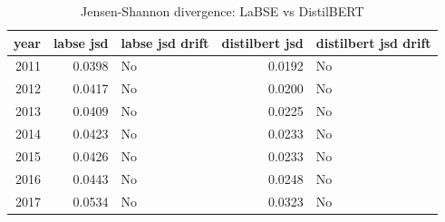 \begin{table}[ht]
\centering
\caption{Jensen-Shannon divergence: LaBSE vs DistilBERT}
\label{tab:labse_vs_distilbert_jsd}
\begin{tabular}{rrlrl}
\toprule
year & labse jsd & labse jsd drift & distilbert jsd & distilbert jsd drift \\
\midrule
2011 & 0.0398 & No & 0.0192 & No \\
2012 & 0.0417 & No & 0.0200 & No \\
2013 & 0.0409 & No & 0.0225 & No \\
2014 & 0.0423 & No & 0.0233 & No \\
2015 & 0.0426 & No & 0.0233 & No \\
2016 & 0.0443 & No & 0.0248 & No \\
2017 & 0.0534 & No & 0.0323 & No \\
\bottomrule
\end{tabular}
\end{table}
